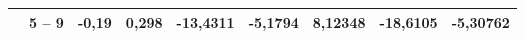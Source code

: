 \documentclass[a4paper,14pt]{article}
\begin{document}
\begin{landscape}
\begin{center}
\begin{longtable}{|c|c|c|c|c|c|c|c|c|}
                                             & 5 – 9                                & -0,19                                                                             & 0,298                                                                            & -13,4311                                                                                                         & -5,1794                                                                            & 8,12348                                                                            & -18,6105                      & -5,30762                      \\ \hline
    \end{longtable}
\end{center}
\end{landscape}
\end{document}
